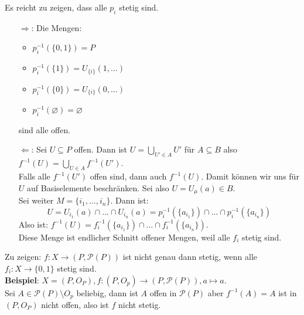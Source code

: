 \begin{problem}[3a]
  Es reicht zu zeigen, dass alle \( p_i \) stetig sind.
  \begin{itemize}
    \item[\( \Rightarrow \):] Die Mengen:
    \begin{itemize}
      \item \( p_i^{-1}(\{ 0,1 \}) = P \)
      \item \( p_i^{-1}(\{ 1 \}) = U_{\{ i \}}(1,\dots) \)
      \item \( p_i^{-1}(\{ 0 \}) = U_{\{ i \}}(0,\dots) \) 
      \item \( p_i^{-1}(\varnothing) = \varnothing \)
    \end{itemize}
    sind alle offen.

    \item[\( \Leftarrow \):] Sei \( U \subseteq P \) offen. Dann ist \( U = \bigcup_{U' \in A}U' \) für \( A \subseteq B \) also \( f^{-1}(U) = \bigcup_{U \in A} f^{-1}(U') \). \\
    Falls alle \( f^{-1}(U') \) offen sind, dann auch \( f^{-1}(U) \). Damit können wir uns für \( U \) auf Basiselemente beschränken. Sei also \( U = U_\mu(a) \in B \). \\
    Sei weiter \( M = \{ i_1, \dots,i_n \} \). Dann ist:
    \begin{equation*}
      U = U_{i_1}(a)\cap \dots \cap U_{i_n}(a) = p_i^{-1}(\{ a_{i_1} \}) \cap \dots \cap p_i^{-1}(\{ a_{i_n} \})
    \end{equation*}
    Also ist: \( f^{-1}(U) = f_i^{-1}(\{ a_{i_1} \}) \cap \dots \cap f_i^{-1}(\{ a_{i_n} \}) \). \\
    Diese Menge ist endlicher Schnitt offener Mengen, weil alle \( f_i \) stetig sind.
  \end{itemize}
\end{problem}

\begin{problem}[3b]
  Zu zeigen: \( f: X \to (P,\mathcal{P}(P)) \) ist nicht genau dann stetig, wenn alle \( f_i: X \to \{ 0,1 \} \) stetig sind. \\
  \textbf{Beispiel}: \( X = (P, O_P), f: (P, O_p) \to (P, \mathcal{P}(P)), a \mapsto a \). \\
  Sei \( A \in \mathcal{P}(P) \setminus O_p \) beliebig, dann ist \( A \) offen in \( \mathcal{P}(P) \) aber 
  \( f^{-1}(A) = A \) ist in \( (P, O_P) \) nicht offen, also ist \( f \) nicht stetig.
\end{problem}



